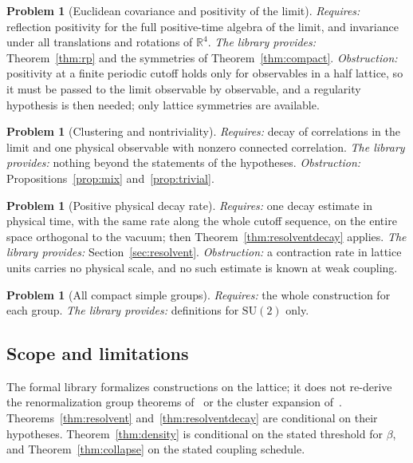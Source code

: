 \documentclass[11pt]{article}
\numberwithin{equation}{subsection}
\theoremstyle{plain}
\theoremstyle{definition}
\newtheorem{problem}[theorem]{Problem}
\newcommand{\R}{\mathbb{R}}
\newcommand{\SU}{\mathrm{SU}}
\begin{document}
\begin{problem}[Euclidean covariance and positivity of the limit]\label{prob:cov}
\emph{Requires:} reflection positivity for the full positive-time algebra of the limit, and
invariance under all translations and rotations of $\R^4$. \emph{The library provides:}
Theorem~\ref{thm:rp} and the symmetries of Theorem~\ref{thm:compact}. \emph{Obstruction:}
positivity at a finite periodic cutoff holds only for observables in a half lattice, so it must
be passed to the limit observable by observable, and a regularity hypothesis is then needed;
only lattice symmetries are available.
\end{problem}

\begin{problem}[Clustering and nontriviality]\label{prob:cluster}
\emph{Requires:} decay of correlations in the limit and one physical observable with nonzero
connected correlation. \emph{The library provides:} nothing beyond the statements of the
hypotheses. \emph{Obstruction:} Propositions~\ref{prop:mix} and~\ref{prop:trivial}.
\end{problem}

\begin{problem}[Positive physical decay rate]\label{prob:gap}
\emph{Requires:} one decay estimate in physical time, with the same rate along the whole cutoff
sequence, on the entire space orthogonal to the vacuum; then
Theorem~\ref{thm:resolventdecay} applies. \emph{The library provides:}
Section~\ref{sec:resolvent}. \emph{Obstruction:} a contraction rate in lattice units carries no
physical scale, and no such estimate is known at weak coupling.
\end{problem}

\begin{problem}[All compact simple groups]\label{prob:groups}
\emph{Requires:} the whole construction for each group. \emph{The library provides:} definitions
for $\SU(2)$ only.
\end{problem}

\subsection{Scope and limitations}

The formal library formalizes constructions on the lattice; it does not re-derive the
renormalization group theorems of~\cite{Balaban} or the cluster expansion
of~\cite{KoteckyPreiss}. Theorems~\ref{thm:resolvent} and~\ref{thm:resolventdecay} are
conditional on their hypotheses. Theorem~\ref{thm:density} is conditional on the stated
threshold for $\beta$, and Theorem~\ref{thm:collapse} on the stated coupling schedule.
\end{document}
